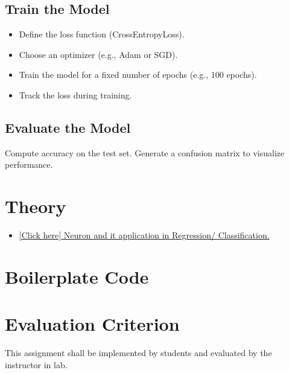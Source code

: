 \documentclass[11pt]{article}
\newcommand{\bvricon}[1]{}
\begin{document}
\subsection{Train the Model}
\label{sec:org164fcbb}
\begin{itemize}
\item Define the loss function (CrossEntropyLoss).
\item Choose an optimizer (e.g., Adam or SGD).
\item Train the model for a fixed number of epochs (e.g.,
100 epochs).
\item Track the loss during training.
\end{itemize}
\subsection{Evaluate the Model}
\label{sec:org8a2ff8a}
Compute accuracy on the test set.  Generate a confusion
matrix to visualize performance.

\section{Theory}
\label{sec:orgb13527f}
\begin{itemize}
\item \href{https://docs.google.com/presentation/d/1Y0N7jhqgCFR6K1e48iIxqRxBkzKXEe27QUDyQ9\_DGLc/edit?usp=sharing}{\bvricon{simple/googleslides}
  [Click here] Neuron
and it application in Regression/ Classification.}
\end{itemize}

\section{Boilerplate Code}
\label{sec:orgdce8c55}
\section{Evaluation Criterion}
\label{sec:orga97672c}

This assignment shall be implemented by students and
evaluated by the instructor in lab.
\end{document}
